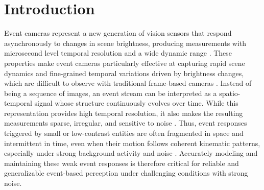 \documentclass[runningheads]{llncs}
\begin{document}
\section{Introduction}
\label{sec:intro}


Event cameras represent a new generation of vision sensors that respond asynchronously to changes in scene brightness, producing measurements with microsecond level temporal resolution and a wide dynamic range \cite{lichtsteiner2008temporal,gallego2022survey}.
These properties make event cameras particularly effective at capturing rapid scene dynamics and fine-grained temporal variations driven by brightness changes, which are difficult to observe with traditional frame-based cameras \cite{kim2016realtime,pan2022high}.
Instead of being a sequence of images, an event stream can be interpreted as a spatio-temporal signal whose structure continuously evolves over time.
While this representation provides high temporal resolution, it also makes the resulting measurements sparse, irregular, and sensitive to noise \cite{shariff2024event}.
Thus, event responses triggered by small or low-contrast entities are often fragmented in space and intermittent in time, even when their motion follows coherent kinematic patterns, especially under strong background activity and noise \cite{mondal2021moving}.
Accurately modeling and maintaining these weak event responses is therefore critical for reliable and generalizable event-based perception under challenging conditions with strong noise.
\end{document}
